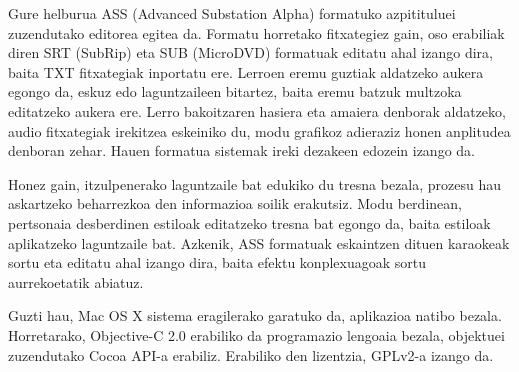 
\thispagestyle{empty}
Gure helburua ASS (Advanced Substation Alpha) formatuko azpitituluei zuzendutako editorea egitea da. Formatu horretako fitxategiez gain, oso erabiliak diren SRT (SubRip) eta SUB (MicroDVD) formatuak editatu ahal izango dira, baita TXT fitxategiak inportatu ere. Lerroen eremu guztiak aldatzeko aukera egongo da, eskuz edo laguntzaileen bitartez, baita eremu batzuk multzoka editatzeko aukera ere. Lerro bakoitzaren hasiera eta amaiera denborak aldatzeko, audio fitxategiak irekitzea eskeiniko du, modu grafikoz adieraziz honen anplitudea denboran zehar. Hauen formatua sistemak ireki dezakeen edozein izango da.

Honez gain, itzulpenerako laguntzaile bat edukiko du tresna bezala, prozesu hau askartzeko beharrezkoa den informazioa soilik erakutsiz. Modu berdinean, pertsonaia desberdinen estiloak editatzeko tresna bat egongo da, baita estiloak aplikatzeko laguntzaile bat. Azkenik, ASS formatuak eskaintzen dituen karaokeak sortu eta editatu ahal izango dira, baita efektu konplexuagoak sortu aurrekoetatik abiatuz.

Guzti hau, Mac OS X sistema eragilerako garatuko da, aplikazioa natibo bezala. Horretarako, Objective-C 2.0 erabiliko da programazio lengoaia bezala, objektuei zuzendutako Cocoa API-a erabiliz. Erabiliko den lizentzia, GPLv2-a izango da.

\clearpage                         %
\thispagestyle{empty} \ \clearpage %
